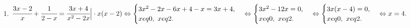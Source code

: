 1. $\cfrac{3x-2}{x}+\cfrac{1}{2-x}=\cfrac{3x+4}{x^2-2x}\Big|\cdot x(x-2)\Leftrightarrow
\begin{cases}
3x^2-2x-6x+4-x=3x+4,\\
x
eq0,\ x
eq 2.\end{cases}\Leftrightarrow\begin{cases}
3x^2-12x=0,\\
x
eq0,\ x
eq 2.\end{cases}\Leftrightarrow\begin{cases}
3x(x-4)=0,\\
x
eq0,\ x
eq 2.\end{cases}\Leftrightarrow x=4.$\\
